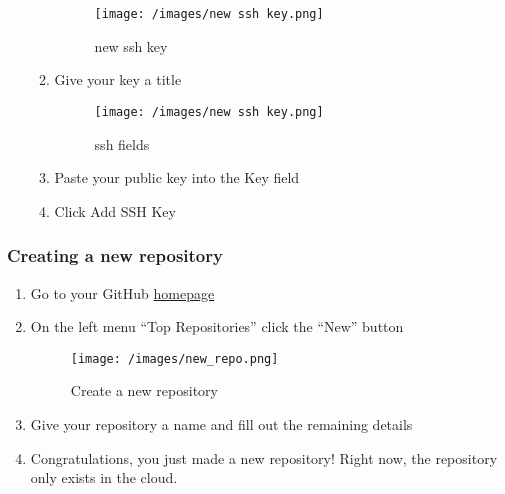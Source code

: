 \documentclass[
  letterpaper,
  DIV=11,
  numbers=noendperiod]{scrartcl}
\begin{document}
\begin{enumerate}
\begin{enumerate}
    \begin{figure}

    {\centering \texttt{[image: /images/new ssh key.png]}

    }

    \caption{new ssh key}

    \end{figure}
  \item
    Give your key a title

    \begin{figure}

    {\centering \texttt{[image: /images/new ssh key.png]}

    }

    \caption{ssh fields}

    \end{figure}
  \item
    Paste your public key into the Key field
  \item
    Click Add SSH Key
  \end{enumerate}
\end{enumerate}

\hypertarget{creating-a-new-repository}{%
\subsubsection{Creating a new
repository}\label{creating-a-new-repository}}

\begin{enumerate}
\def\labelenumi{\arabic{enumi}.}
\item
  Go to your GitHub \href{https://github.com/}{homepage}
\item
  On the left menu ``Top Repositories'' click the ``New'' button

  \begin{figure}

  {\centering \texttt{[image: /images/new\_repo.png]}

  }

  \caption{Create a new repository}

  \end{figure}
\item
  Give your repository a name and fill out the remaining details
\item
  Congratulations, you just made a new repository! Right now, the
  repository only exists in the cloud.
\end{enumerate}
\end{document}
